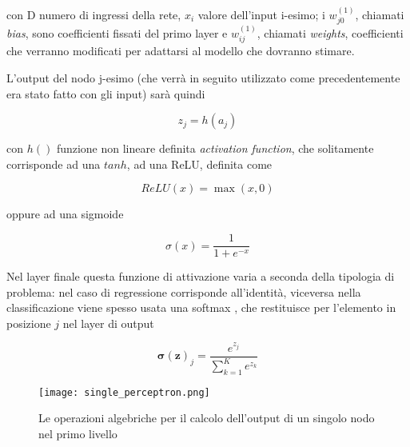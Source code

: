 con D numero di ingressi della rete, $x_i$ valore dell'input i-esimo; i $w_{j0}^{(1)}$, chiamati \textit{bias}, sono coefficienti fissati
del primo layer e 
$w_{ij}^{(1)}$, chiamati \textit{weights}, coefficienti che verranno modificati per adattarsi al modello che dovranno stimare.

L'output del nodo j-esimo (che verrà in seguito utilizzato come precedentemente era stato fatto con gli input) sarà quindi
\cite{bishop2006pattern}

\begin{equation}
    z_j = h(a_j)
    \label{eq:activation}
\end{equation}

con $h()$ funzione non lineare definita \textit{activation function}, che solitamente corrisponde ad una $tanh$, ad una 
ReLU, definita come \cite{Nwankpa2018}

\begin{equation}
    ReLU(x) = \max (x, 0)
    \label{eq:relu}
\end{equation}

\noindent
oppure ad una sigmoide \cite{Nwankpa2018}

\begin{equation}
    \sigma(x) = \frac{1}{1+e^{-x}}
    \label{eq:sigmoid}
\end{equation}


Nel layer finale questa funzione di attivazione varia a seconda della tipologia di problema: nel caso di regressione 
corrisponde all'identità, 
viceversa nella classificazione viene spesso usata una softmax \cite{Keck2014}, che restituisce per 
l'elemento in posizione $j$ nel layer di output 

\begin{equation}
    \mathbf{\sigma(z)}_j = \frac{e^{z_j}}{\sum_{k=1}^{K}e^{z_k}}
    \label{eq:softmax}
\end{equation}

\begin{figure}[h]
    \begin{small}
        \begin{center}
            \texttt{[image: single\_perceptron.png]}
        \end{center}
        \caption{Le operazioni algebriche per il calcolo dell'output di un singolo nodo 
            nel primo livello \cite{Dillinger2018}}
        \label{fig:}
    \end{small}
\end{figure}

